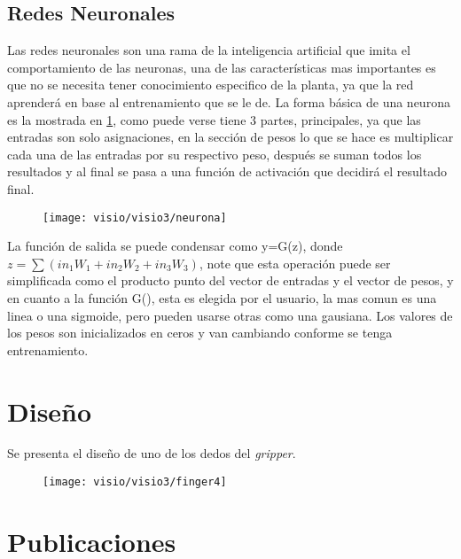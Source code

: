\section{Redes Neuronales}
Las redes neuronales son una rama de la inteligencia artificial que imita el comportamiento de las neuronas, una de las características mas importantes es que no se necesita tener conocimiento especifico de la planta, ya que la red aprenderá en base al entrenamiento que se le de. La forma básica de una neurona es la mostrada en \cref{fig:neurona}, como puede verse tiene 3 partes, principales, ya que las entradas son solo asignaciones, en la sección de pesos lo que se hace es multiplicar cada una de las entradas por su respectivo peso, después se suman todos los resultados y al final se pasa a una función de activación que decidirá el resultado final. 
\begin{figure}[h]
	\centering
	\texttt{[image: visio/visio3/neurona]}
	\caption{}
	\label{fig:neurona}
\end{figure}
La función de salida se puede condensar como y=G(z), donde $ z=\sum(in_1 W_1 + in_2 W_2 + in_3 W_3)$, note que esta operación puede ser simplificada como el producto punto del vector de entradas y el vector de pesos, y en cuanto a la función G(), esta es elegida por el usuario, la mas comun es una linea o una sigmoide, pero pueden usarse otras como una gausiana. Los valores de los pesos son inicializados en ceros y van cambiando conforme se tenga entrenamiento.



\chapter{Diseño}\label{diseno}
Se presenta el diseño de uno de los dedos del \textit{gripper}.

\begin{figure}[h]
	\centering
	\texttt{[image: visio/visio3/finger4]}
	\caption{}
	\label{fig:finger4}
\end{figure}

\chapter{Publicaciones}\label{publicaciones}
\cite{tuyinincluded2017}
